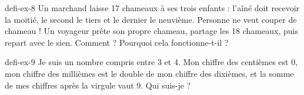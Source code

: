 \begin{blocEdition}{defi-ex-8}
Un marchand laisse 17 chameaux à ses trois enfants : l’aîné doit recevoir la moitié, le second le tiers et le dernier le neuvième. Personne ne veut couper de chameau ! Un voyageur prête son propre chameau, partage les 18 chameaux, puis repart avec le sien. Comment ? Pourquoi cela fonctionne-t-il ?\par{}\par\par{}\par{}\par{}\par{}\par{}\par{}
\end{blocEdition}
\begin{blocEdition}{defi-ex-9}
Je suis un nombre compris entre 3 et 4. Mon chiffre des centièmes est 0, mon chiffre des millièmes est le double de mon chiffre des dixièmes, et la somme de mes chiffres après la virgule vaut 9. Qui suis-je ?\par{}\par\par{}\par{}\par{}\par{}\par{}\par{}
\end{blocEdition}
